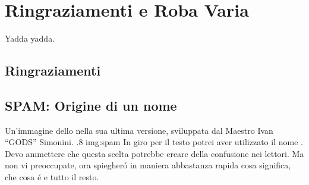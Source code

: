 \chapter{Ringraziamenti e Roba Varia}
\label{chap:Thanks}

Yadda yadda.

\section{Ringraziamenti}

\section{SPAM: Origine di un nome}
        {Un'immagine dello \SPAM{} nella sua ultima versione,
            sviluppata dal Maestro Ivan ``GODS'' Simonini.}
        {.8}
        {img:spam}
In giro per il testo potrei aver utilizzato il nome \SPAM{}. Devo ammettere
che questa scelta potrebbe creare della confusione nei lettori. Ma non vi
preoccupate, ora spiegher\'o in maniera abbastanza rapida cosa significa,
che cosa \'e e tutto il resto.

\cleardoublepage

